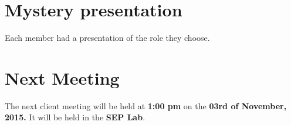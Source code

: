 \documentclass[a4paper]{article}
\begin{document}
\section{Mystery presentation}
Each member had a presentation of the role they choose.\\

\section{Next Meeting}
The next client meeting will be held at \textbf{1:00 pm} on the \textbf{03rd of November, 2015.} It will be held in the \textbf{SEP Lab}.
\end{document}
